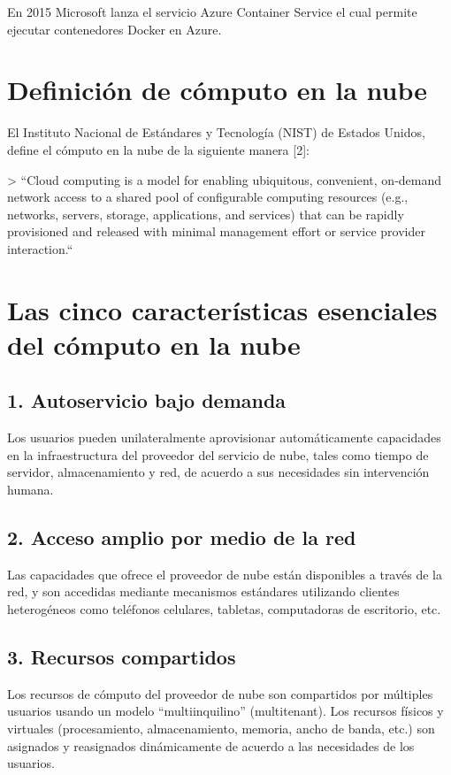 En 2015 Microsoft lanza el servicio Azure Container Service el cual permite ejecutar contenedores Docker en Azure.

\section{Definición de cómputo en la nube}

El Instituto Nacional de Estándares y Tecnología (NIST) de Estados Unidos, define el cómputo en la nube de la siguiente manera [2]:

> ``Cloud computing is a model for enabling ubiquitous, convenient, on-demand network access to a shared pool of configurable computing resources (e.g., networks, servers, storage, applications, and services) that can be rapidly provisioned and released with minimal management effort or service provider interaction.``

\section{Las cinco características esenciales del cómputo en la nube}

\subsection{1. Autoservicio bajo demanda}

Los usuarios pueden unilateralmente aprovisionar automáticamente capacidades en la infraestructura del proveedor del servicio de nube, tales como tiempo de servidor, almacenamiento y red, de acuerdo a sus necesidades sin intervención humana.

\subsection{2. Acceso amplio por medio de la red}

Las capacidades que ofrece el proveedor de nube están disponibles a través de la red, y son accedidas mediante mecanismos estándares utilizando clientes heterogéneos como teléfonos celulares, tabletas, computadoras de escritorio, etc.

\subsection{3. Recursos compartidos}

Los recursos de cómputo del proveedor de nube son compartidos por múltiples usuarios usando un modelo “multiinquilino” (multitenant). Los recursos físicos y virtuales (procesamiento, almacenamiento, memoria, ancho de banda, etc.) son asignados y reasignados dinámicamente de acuerdo a las necesidades de los usuarios.

